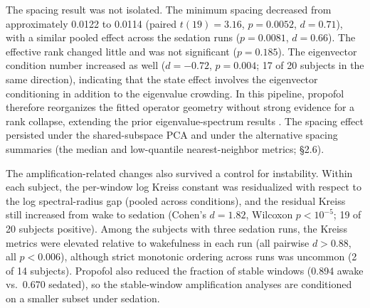 \documentclass[preprint,12pt,nonatbib]{elsarticle}
\begin{document}
The spacing result was not isolated. The minimum spacing decreased from approximately 0.0122 to 0.0114 (paired $t(19)=3.16$, $p=0.0052$, $d=0.71$), with a similar pooled effect across the sedation runs ($p=0.0081$, $d=0.66$). The effective rank changed little and was not significant ($p=0.185$). The eigenvector condition number increased as well ($d=-0.72$, $p=0.004$; 17 of 20 subjects in the same direction), indicating that the state effect involves the eigenvector conditioning in addition to the eigenvalue crowding. In this pipeline, propofol therefore reorganizes the fitted operator geometry without strong evidence for a rank collapse, extending the prior eigenvalue-spectrum results \citep{Eisen2024,Eisen2026}. The spacing effect persisted under the shared-subspace PCA and under the alternative spacing summaries (the median and low-quantile nearest-neighbor metrics; \S2.6).

The amplification-related changes also survived a control for instability. Within each subject, the per-window log Kreiss constant was residualized with respect to the log spectral-radius gap (pooled across conditions), and the residual Kreiss still increased from wake to sedation (Cohen's $d=1.82$, Wilcoxon $p<10^{-5}$; 19 of 20 subjects positive). Among the subjects with three sedation runs, the Kreiss metrics were elevated relative to wakefulness in each run (all pairwise $d>0.88$, all $p<0.006$), although strict monotonic ordering across runs was uncommon (2 of 14 subjects). Propofol also reduced the fraction of stable windows (0.894 awake vs.\ 0.670 sedated), so the stable-window amplification analyses are conditioned on a smaller subset under sedation.
\end{document}
